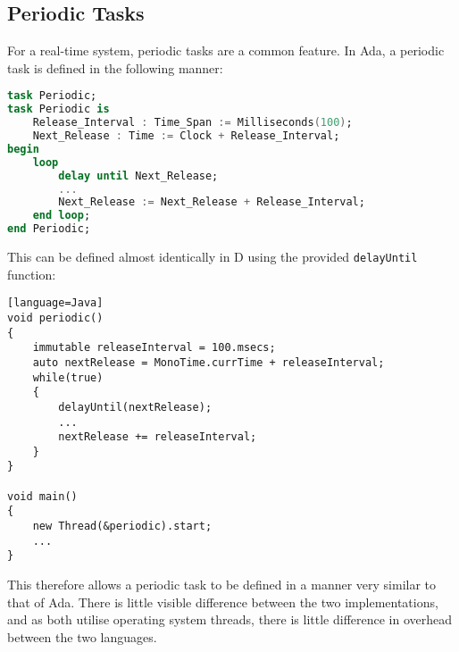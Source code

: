\subsection{Periodic Tasks}
For a real-time system, periodic tasks are a common feature. In Ada, a periodic
task is defined in the following manner: 
\begin{lstlisting}[basicstyle=\small,language=Ada]
task Periodic; 
task Periodic is 
    Release_Interval : Time_Span := Milliseconds(100); 
    Next_Release : Time := Clock + Release_Interval; 
begin
    loop 
        delay until Next_Release; 
        ... 
        Next_Release := Next_Release + Release_Interval; 
    end loop; 
end Periodic; 
\end{lstlisting}
This can be defined almost identically in D using the provided \texttt{delayUntil} function: 
\begin{lstlisting}[basicstyle=\small][language=Java]
void periodic()
{
    immutable releaseInterval = 100.msecs; 
    auto nextRelease = MonoTime.currTime + releaseInterval; 
    while(true)
    {
        delayUntil(nextRelease); 
        ...
        nextRelease += releaseInterval; 
    }
}

void main()
{
    new Thread(&periodic).start; 
    ...
}
\end{lstlisting}
This therefore allows a periodic task to be defined in a manner very
similar to that of Ada. There is little visible difference between the two
implementations, and as both utilise operating system threads, there is little
difference in overhead between the two languages. 

